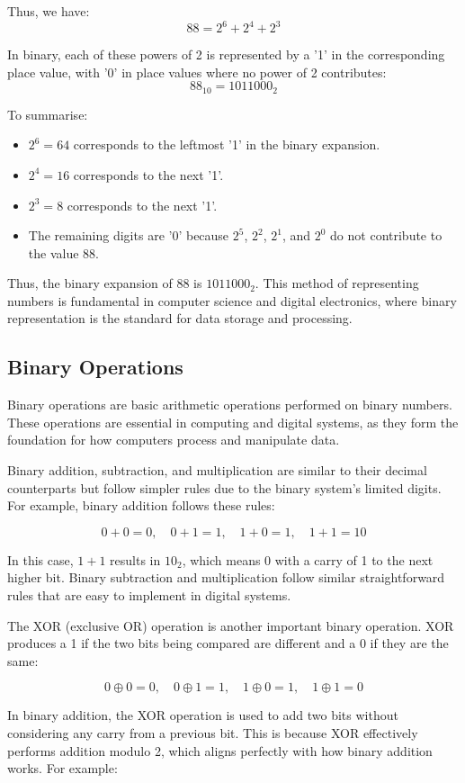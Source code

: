 Thus, we have:
\[
88 = 2^6 + 2^4 + 2^3
\]

In binary, each of these powers of 2 is represented by a '1' in the corresponding place value, with '0' in place values where no power of 2 contributes:
\[
88_{10} = 1011000_2
\]

To summarise:
\begin{itemize}
    \item $2^6 = 64$ corresponds to the leftmost '1' in the binary expansion.
    \item $2^4 = 16$ corresponds to the next '1'.
    \item $2^3 = 8$ corresponds to the next '1'.
    \item The remaining digits are '0' because $2^5$, $2^2$, $2^1$, and $2^0$ do not contribute to the value 88.
\end{itemize}

Thus, the binary expansion of 88 is $1011000_2$. This method of representing numbers is fundamental in computer science and digital electronics, where binary representation is the standard for data storage and processing.

\subsection*{Binary Operations}
Binary operations are basic arithmetic operations performed on binary numbers. These operations are essential in computing and digital systems, as they form the foundation for how computers process and manipulate data.

Binary addition, subtraction, and multiplication are similar to their decimal counterparts but follow simpler rules due to the binary system's limited digits. For example, binary addition follows these rules:

\[
0 + 0 = 0, \quad 0 + 1 = 1, \quad 1 + 0 = 1, \quad 1 + 1 = 10
\]

In this case, \(1 + 1\) results in \(10_2\), which means 0 with a carry of 1 to the next higher bit. Binary subtraction and multiplication follow similar straightforward rules that are easy to implement in digital systems.

The XOR (exclusive OR) operation is another important binary operation. XOR produces a 1 if the two bits being compared are different and a 0 if they are the same:

\[
0 \oplus 0 = 0, \quad 0 \oplus 1 = 1, \quad 1 \oplus 0 = 1, \quad 1 \oplus 1 = 0
\]

In binary addition, the XOR operation is used to add two bits without considering any carry from a previous bit. This is because XOR effectively performs addition modulo 2, which aligns perfectly with how binary addition works. For example:

